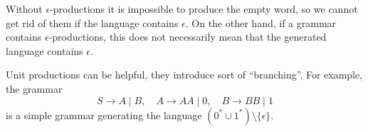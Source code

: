 

\setcounter{section}{5}
\setcounter{subsection}{2}
\setcounter{dfn}{7}


Without $\epsilon$-productions it is impossible to produce the empty word,
so we cannot get rid of them if the language contains $\epsilon$.
On the other hand, if a grammar contains $\epsilon$-productions,
this does not necessarily mean that the generated language contains $\epsilon$.

Unit productions can be helpful, they introduce sort of ``branching''. For example, the grammar
\[
S \to A \mid B, \quad A \to AA \mid 0, \quad B \to BB \mid 1
\]
is a simple grammar generating the language $(0^* \cup 1^*) \setminus \{\epsilon\}$.



